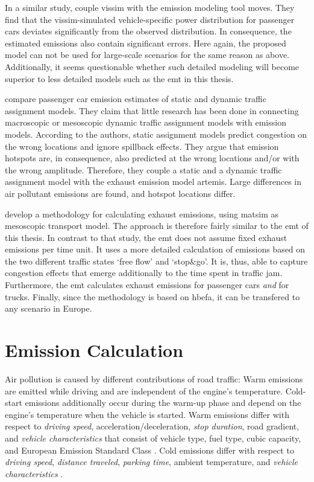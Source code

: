 In a similar study, \citet{SongEtAl_TRR_2012} couple 
\acrshort{vissim} with the emission modeling tool \acrshort{moves}. They find 
that the \acrshort{vissim}-simulated vehicle-specific power distribution for 
passenger cars deviates significantly from the observed distribution. In 
consequence, the estimated emissions also contain significant errors. Here 
again, the proposed model can not be used for large-scale scenarios for the 
same reason as above. Additionally, it seems questionable whether such detailed 
modeling will become superior to less detailed models such as the \gls{emt} in 
this thesis.

\citet{WismansEtAl_TRB_2013} compare passenger car emission 
estimates of static and dynamic traffic assignment models. They claim that 
little research has been done in connecting macroscopic or mesoscopic dynamic 
traffic assignment models with emission models.
%
According to the authors, static assignment models predict congestion on the 
wrong locations and ignore spillback effects. They argue that emission 
hotspots are, in consequence, also predicted at the wrong locations and/or 
with the wrong amplitude.
%
Therefore, they couple a static and a dynamic traffic assignment model with 
the exhaust emission model \acrshort{artemis}. Large differences in air 
pollutant emissions are found, and hotspot locations differ.

\citet{HatzopoulouMiller_TransResD_2010} develop a methodology for 
calculating exhaust emissions, using \gls{matsim} as mesoscopic transport 
model. The approach is therefore fairly similar to the \gls{emt} of this thesis.
%
In contrast to that study, the \gls{emt} does not assume fixed exhaust 
emissions per time unit. It uses a more detailed calculation of emissions based 
on the two different traffic states `free flow' and `stop\&go'. It is, thus, 
able to capture congestion effects that emerge additionally to the time spent 
in traffic jam. 
Furthermore, the \gls{emt} calculates exhaust emissions for passenger cars 
\emph{and} for trucks. Finally, since the methodology is based on \gls{hbefa}, 
it can be transfered to any scenario in Europe.

\section{Emission Calculation}
\label{ch:emissions:overview}
%
Air pollution is caused by different contributions of road traffic:
%
Warm emissions are emitted while driving and are independent of the engine's temperature.
%
Cold-start emissions additionally occur during the warm-up phase and depend on the engine's temperature when the vehicle is started.
%
Warm emissions differ with respect to \emph{driving speed}, acceleration/deceleration, \emph{stop duration}, road gradient, and \emph{vehicle characteristics} that consist of vehicle type, fuel type, cubic capacity, and European Emission Standard Class \citep{AndreRapone_Atmos_2009}.
%
Cold emissions differ with respect to \emph{driving speed}, \emph{distance traveled}, \emph{parking time}, ambient temperature, and \emph{vehicle characteristics} \citep{WeilenmannEtAl_Atmos_2009}.

